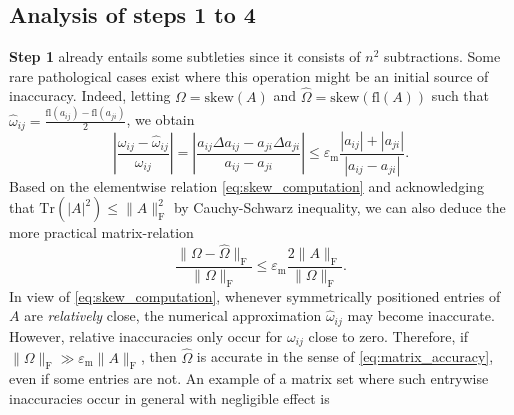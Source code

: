 \documentclass[10pt,twoside,dvipsnames]{siamart1116}
\numberwithin{algorithm}{section}
\numberwithin{equation}{section}
\newcommand{\fl}{\mathrm{fl}}
\begin{document}
\subsection{Analysis of steps 1 to 4}
	\textbf{Step 1} already entails some subtleties since it consists of $n^2$ subtractions. Some rare pathological cases exist where this operation might be an initial source of inaccuracy. Indeed, letting $\Omega=\mathrm{skew}(A)$ and $\widehat{\Omega}=\mathrm{skew}(\fl(A))$ such that $\widehat{\omega}_{ij}=\frac{\fl(a_{ij})-\fl(a_{ji})}{2}$, we obtain
	\begin{equation}\label{eq:skew_computation}
		\left|\frac{\omega_{ij}-\widehat{\omega}_{ij}}{\omega_{ij}}\right|=\left|\frac{a_{ij}\Delta a_{ij}-a_{ji}\Delta a_{ji}}{a_{ij}-a_{ji}} \right|\leq \varepsilon_\mathrm{m}\frac{|a_{ij}|+|a_{ji}|}{|a_{ij}-a_{ji}|}.
	\end{equation}
Based on the elementwise relation \eqref{eq:skew_computation} and acknowledging that $\mathrm{Tr}(|A|^2)\leq\|A\|_\mathrm{F}^2$ by Cauchy-Schwarz inequality, we can also deduce the more practical matrix-relation
\begin{equation}\label{eq:matrix_accuracy}
 \frac{\|\Omega-\widehat{\Omega}\|_\mathrm{F}}{\|\Omega\|_\mathrm{F}}\leq \varepsilon_\mathrm{m} \frac{2\|A\|_\mathrm{F}}{\|\Omega\|_\mathrm{F}}.
 \end{equation} In view of \eqref{eq:skew_computation}, whenever symmetrically positioned entries of $A$ are \emph{relatively} close, the numerical approximation $\widehat{\omega}_{ij}$ may become inaccurate. %
However, relative inaccuracies only occur for $\omega_{ij}$ close to zero. Therefore, if $\|\Omega\|_\mathrm{F}\gg \varepsilon_\mathrm{m}\|A\|_\mathrm{F}$, then $\widehat{\Omega}$ is accurate in the sense of \eqref{eq:matrix_accuracy}, even if some entries are not. An example of a matrix set where such entrywise inaccuracies occur in general with negligible effect is 
\end{document}
